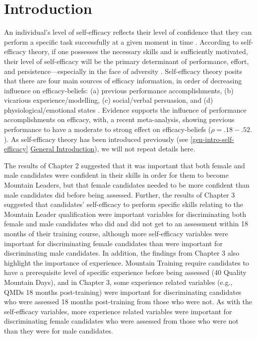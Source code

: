 \documentclass[
  12pt,
  a4paper,
]{book}
\begin{document}
\hypertarget{chapter-4-introduction}{%
\section{Introduction}\label{chapter-4-introduction}}

An individual's level of self-efficacy reflects their level of confidence that they can perform a specific task successfully at a given moment in time \citep{Bandura1977}. According to self-efficacy theory, if one possesses the necessary skills and is sufficiently motivated, their level of self-efficacy will be the primary determinant of performance, effort, and persistence---especially in the face of adversity \citep{Bandura1977, Bandura1982, Bandura1997}. Self-efficacy theory posits that there are four main sources of efficacy information, in order of decreasing influence on efficacy-beliefs: (a) previous performance accomplishments, (b) vicarious experience/modelling, (c) social/verbal persuasion, and (d) physiological/emotional states \citep{Bandura1982}. Evidence supports the influence of performance accomplishments on efficacy, with, a recent meta-analysis, \citet{Sitzmann2013} showing previous performance to have a moderate to strong effect on efficacy-beliefs (\(\rho = .18-.52.\)). As self-efficacy theory has been introduced previously (see \ref{gen-intro-self-efficacy} \protect\hyperlink{gen-intro-self-efficacy}{General Introduction}), we will not repeat details here.

The results of Chapter 2 suggested that it was important that both female and male candidates were confident in their skills in order for them to become Mountain Leaders, but that female candidates needed to be more confident than male candidates did before being assessed. Further, the results of Chapter 3 suggested that candidates' self-efficacy to perform specific skills relating to the Mountain Leader qualification were important variables for discriminating both female and male candidates who did and did not get to an assessment within 18 months of their training course, although more self-efficacy variables were important for discriminating female candidates than were important for discriminating male candidates. In addition, the findings from Chapter 3 also highlight the importance of experience. Mountain Training require candidates to have a prerequisite level of specific experience before being assessed (40 Quality Mountain Days), and in Chapter 3, some experience related variables (e.g., QMDs 18 months post-training) were important for discriminating candidates who were assessed 18 months post-training from those who were not. As with the self-efficacy variables, more experience related variables were important for discriminating female candidates who were assessed from those who were not than they were for male candidates.
\end{document}
